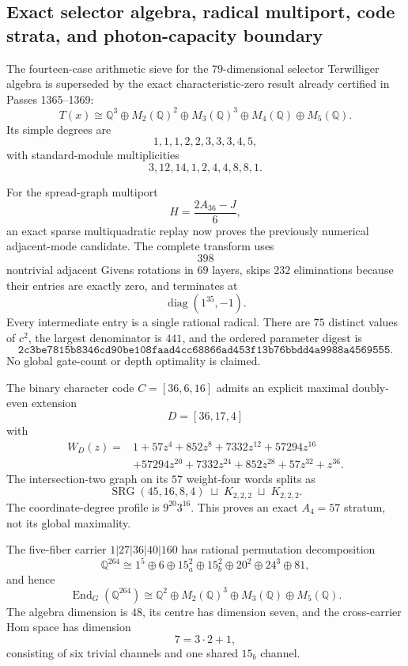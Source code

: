\subsection{Exact selector algebra, radical multiport, code strata, and photon-capacity boundary}
\label{sec:bt3957-3964}

The fourteen-case arithmetic sieve for the $79$-dimensional selector Terwilliger algebra is superseded by the exact characteristic-zero result already certified in Passes 1365--1369:
\[
T(x)\cong
\mathbb Q^3\oplus M_2(\mathbb Q)^2\oplus M_3(\mathbb Q)^3
\oplus M_4(\mathbb Q)\oplus M_5(\mathbb Q).
\]
Its simple degrees are
\[
1,1,1,2,2,3,3,3,4,5,
\]
with standard-module multiplicities
\[
3,12,14,1,2,4,4,8,8,1.
\]

For the spread-graph multiport
\[
H=\frac{2A_{36}-J}{6},
\]
an exact sparse multiquadratic replay now proves the previously numerical adjacent-mode candidate.  The complete transform uses
\[
398
\]
nontrivial adjacent Givens rotations in $69$ layers, skips $232$ eliminations because their entries are exactly zero, and terminates at
\[
\operatorname{diag}(1^{35},-1).
\]
Every intermediate entry is a single rational radical.  There are $75$ distinct values of $c^2$, the largest denominator is $441$, and the ordered parameter digest is
\[
\texttt{2c3be7815b8346cd90be108faad4cc68866ad453f13b76bbdd4a9988a4569555}.
\]
No global gate-count or depth optimality is claimed.

The binary character code $C=[36,6,16]$ admits an explicit maximal doubly-even extension
\[
D=[36,17,4]
\]
with
\[
\begin{aligned}
W_D(z)={}&1+57z^4+852z^8+7332z^{12}+57294z^{16}\\
&+57294z^{20}+7332z^{24}+852z^{28}+57z^{32}+z^{36}.
\end{aligned}
\]
The intersection-two graph on its $57$ weight-four words splits as
\[
\boxed{
\operatorname{SRG}(45,16,8,4)\;\sqcup\;K_{2,2,2}\;\sqcup\;K_{2,2,2}.
}
\]
The coordinate-degree profile is $9^{20}3^{16}$.  This proves an exact $A_4=57$ stratum, not its global maximality.

The five-fiber carrier $1|27|36|40|160$ has rational permutation decomposition
\[
\mathbb Q^{264}\cong
1^5\oplus6\oplus15_a^2\oplus15_b^2\oplus20^2\oplus24^3\oplus81,
\]
and hence
\[
\boxed{
\operatorname{End}_G(\mathbb Q^{264})
\cong
\mathbb Q^2\oplus M_2(\mathbb Q)^3\oplus M_3(\mathbb Q)\oplus M_5(\mathbb Q).
}
\]
The algebra dimension is $48$, its centre has dimension seven, and the cross-carrier Hom space has dimension
\[
7=3\cdot2+1,
\]
consisting of six trivial channels and one shared $15_b$ channel.

